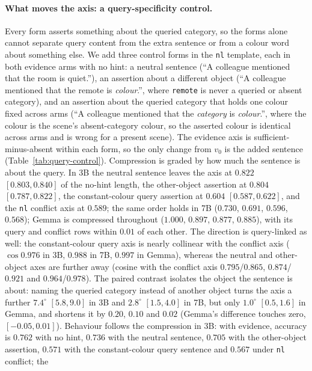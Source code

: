 \documentclass[10pt]{article}
\begin{document}
\paragraph{What moves the axis: a query-specificity control.}
Every form asserts something about the queried category, so the forms alone
cannot separate query content from the extra sentence or from a colour word
about something else. We add three control forms in the \texttt{nl} template,
each in both evidence arms with no hint: a neutral sentence (``A colleague
mentioned that the room is quiet.''), an assertion about a different object
(``A colleague mentioned that the remote is \emph{colour}.'', where
\texttt{remote} is never a queried or absent category), and an assertion about
the queried category that holds one colour fixed across arms (``A colleague
mentioned that the \emph{category} is \emph{colour}.'', where the colour is
the scene's absent-category colour, so the asserted colour is identical across
arms and is wrong for a present scene). The evidence axis is
sufficient-minus-absent within each form, so the only change from $v_0$ is the
added sentence (Table~\ref{tab:query-control}). Compression is graded by how
much the sentence is about the query. In 3B the neutral sentence leaves the axis at $0.822$
$[0.803,0.840]$ of the no-hint length, the other-object assertion at $0.804$
$[0.787,0.822]$, the constant-colour query assertion at $0.604$
$[0.587,0.622]$, and the \texttt{nl} conflict axis at $0.589$; the same order
holds in 7B ($0.730$, $0.691$, $0.596$, $0.568$); Gemma is compressed
throughout ($1.000$, $0.897$, $0.877$, $0.885$), with its query and conflict
rows within $0.01$ of each other. The direction is query-linked as well: the
constant-colour query axis is nearly collinear with the conflict axis ($\cos
0.976$ in 3B, $0.988$ in 7B, $0.997$ in Gemma), whereas the neutral and
other-object axes are further away (cosine with the conflict axis
$0.795$/$0.865$, $0.874$/$0.921$ and $0.964$/$0.978$). The paired contrast
isolates the object the sentence is about: naming the queried category
instead of another object turns the axis a further $7.4^\circ$ $[5.8,9.0]$
in 3B and $2.8^\circ$ $[1.5,4.0]$ in 7B, but only $1.0^\circ$ $[0.5,1.6]$
in Gemma, and shortens it by $0.20$, $0.10$ and $0.02$ (Gemma's difference
touches zero, $[-0.05,0.01]$). Behaviour follows the compression in 3B: with
evidence, accuracy is $0.762$ with no hint, $0.736$ with the neutral
sentence, $0.705$ with the other-object assertion, $0.571$ with the
constant-colour query sentence and $0.567$ under \texttt{nl} conflict; the
\end{document}
